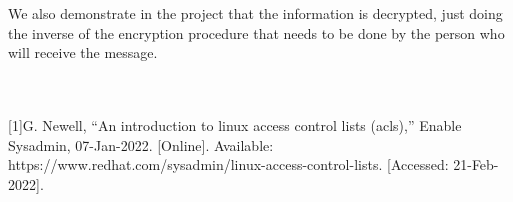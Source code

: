 \documentclass[twoside,twocolumn]{article}
\begin{document}
We also demonstrate in the project that the information is decrypted, just doing the inverse of the encryption procedure that needs to be done by the person who will receive the message. \\ \\ \\

\begin{thebibliography}{} %
\footnotesize[1]G. Newell, “An introduction to linux access control lists (acls),” Enable Sysadmin, 07-Jan-2022. [Online]. Available: https://www.redhat.com/sysadmin/linux-access-control-lists. [Accessed: 21-Feb-2022]. \\ \\
 
\end{thebibliography}


\end{document}
